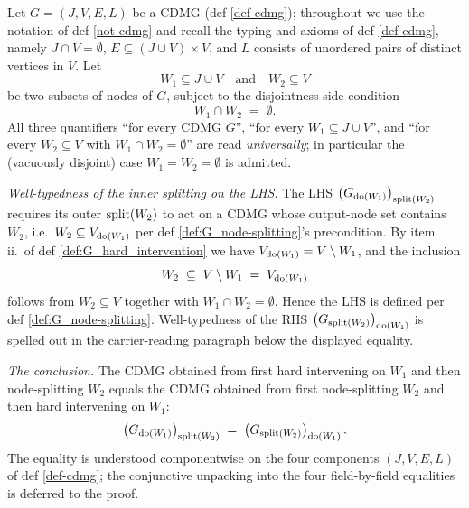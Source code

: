 \documentclass[main]{subfiles}
\begin{document}
\begin{Lem}\label{disjoint-hard-interventions-node-splittings-commute}
    Let $G = (J, V, E, L)$ be a CDMG (def \ref{def-cdmg}); throughout we use the notation of def \ref{not-cdmg} and recall the typing and axioms of def \ref{def-cdmg}, namely $J \cap V = \emptyset$, $E \subseteq (J \cup V) \times V$, and $L$ consists of unordered pairs of distinct vertices in $V$. Let
    \[ W_1 \subseteq J \cup V \quad\text{and}\quad W_2 \subseteq V \]
    be two subsets of nodes of $G$, subject to the disjointness side condition
    \[ W_1 \cap W_2 \;=\; \emptyset. \]
    All three quantifiers ``for every CDMG $G$'', ``for every $W_1 \subseteq J \cup V$'', and ``for every $W_2 \subseteq V$ with $W_1 \cap W_2 = \emptyset$'' are read \emph{universally}; in particular the (vacuously disjoint) case $W_1 = W_2 = \emptyset$ is admitted.

    \emph{Well-typedness of the inner splitting on the LHS.}
    The LHS $\left ( G_{\operatorname{do}(W_1)} \right )_{\mathrm{split}(W_2)}$ requires its outer $\mathrm{split}(W_2)$ to act on a CDMG whose output-node set contains $W_2$, i.e.\ $W_2 \subseteq V_{\operatorname{do}(W_1)}$ per def \ref{def:G_node-splitting}'s precondition. By item ii.\ of def \ref{def:G_hard_intervention} we have $V_{\operatorname{do}(W_1)} = V \setminus W_1$, and the inclusion
    \[ W_2 \;\subseteq\; V \setminus W_1 \;=\; V_{\operatorname{do}(W_1)} \]
    follows from $W_2 \subseteq V$ together with $W_1 \cap W_2 = \emptyset$. Hence the LHS is defined per def \ref{def:G_node-splitting}. Well-typedness of the RHS $\left ( G_{\mathrm{split}(W_2)} \right )_{\operatorname{do}(W_1)}$ is spelled out in the carrier-reading paragraph below the displayed equality.

    \emph{The conclusion.}
    The CDMG obtained from first hard intervening on $W_1$ and then node-splitting $W_2$ equals the CDMG obtained from first node-splitting $W_2$ and then hard intervening on $W_1$:
    \[ \left ( G_{\operatorname{do}(W_1)} \right )_{\mathrm{split}(W_2)} \;=\; \left ( G_{\mathrm{split}(W_2)} \right )_{\operatorname{do}(W_1)}. \]
    The equality is understood componentwise on the four components $(J, V, E, L)$ of def \ref{def-cdmg}; the conjunctive unpacking into the four field-by-field equalities is deferred to the proof.


\end{Lem}
\end{document}
